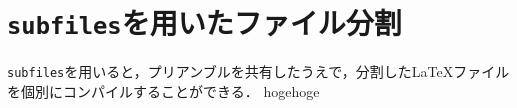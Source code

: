 \documentclass[../main]{subfiles}
\begin{document}
\section{\texttt{subfiles}を用いたファイル分割}

\texttt{subfiles}を用いると，プリアンブルを共有したうえで，分割した{\LaTeX}ファイルを個別にコンパイルすることができる．
hogehoge
\end{document}
